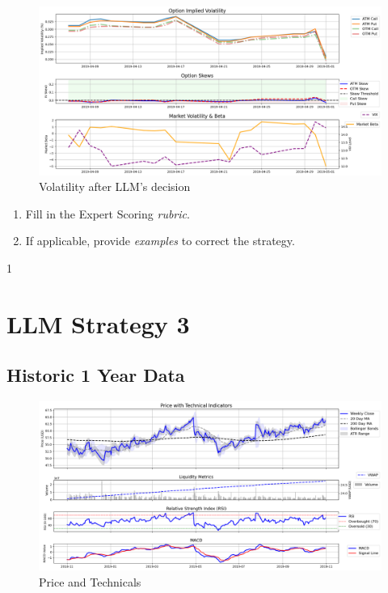 \documentclass[8pt]{scrartcl}
\begin{document}
\begin{figure}[H]
    \centering
    \includegraphics[width=1\linewidth]{judge_reviews/AAPL_M_gpt-4o-mini/2019-04-01/llm_Market_Volatility_&_Beta.png}
    \caption{Volatility after LLM's decision}
\end{figure}

\begin{tcolorbox}[colback=blue!10, colframe=blue!60, title=\textbf{TASKS}, sharp corners=southwest]
\begin{enumerate}
    \item Fill in the Expert Scoring \textit{rubric}.
    \item If applicable, provide \textit{examples} to correct the strategy.
\end{enumerate}
\end{tcolorbox}
\newpage


1\section*{LLM Strategy 3}
\label{app:s3}

\subsection*{Historic 1 Year Data}

\begin{figure}[H]
    \centering
    \includegraphics[width=1\linewidth]{judge_reviews//GOOGL_M_gpt-4o-mini//2019-11-01/judge_Price_with_Technical_Indicators.png}
    \caption{Price and Technicals}
\end{figure}
\end{document}
